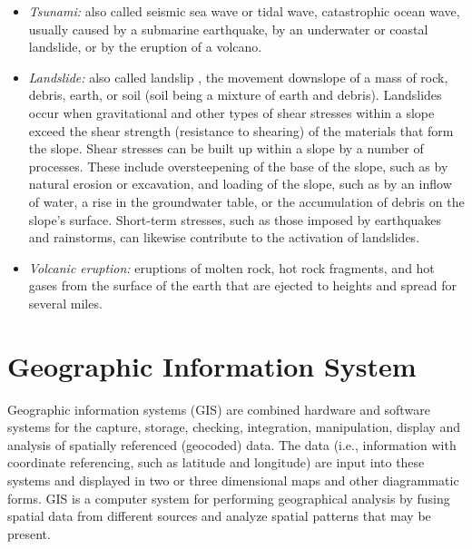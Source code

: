 \begin{itemize}
	\item \textit{Tsunami:} also called seismic sea wave or tidal wave, catastrophic ocean wave, usually caused by a submarine earthquake, by an underwater or coastal landslide, or by the eruption of a volcano.	
	\item \textit{Landslide:} also called landslip , the movement downslope of a mass of rock, debris, earth, or soil (soil being a mixture of earth and debris). Landslides occur when gravitational and other types of shear stresses within a slope exceed the shear strength (resistance to shearing) of the materials that form the slope. Shear stresses can be built up within a slope by a number of processes. These include oversteepening of the base of the slope, such as by natural erosion or excavation, and loading of the slope, such as by an inflow of water, a rise in the groundwater table, or the accumulation of debris on the slope's surface. Short-term stresses, such as those imposed by earthquakes and rainstorms, can likewise contribute to the activation of landslides.
	\item \textit{Volcanic eruption:} eruptions of molten rock, hot rock fragments, and hot gases from the surface of the earth that are ejected to heights and spread for several miles.
\end{itemize}

\newpage
\section{Geographic Information System}
Geographic information systems (GIS) are combined hardware and software systems for the capture, storage, checking, integration, manipulation, display and analysis of spatially referenced (geocoded) data. The data (i.e., information with coordinate referencing, such as latitude and longitude) are input into these systems and displayed in two or three dimensional maps and other diagrammatic forms.
GIS is a computer system for performing geographical analysis by fusing spatial data from different sources and analyze spatial patterns that may be present.

